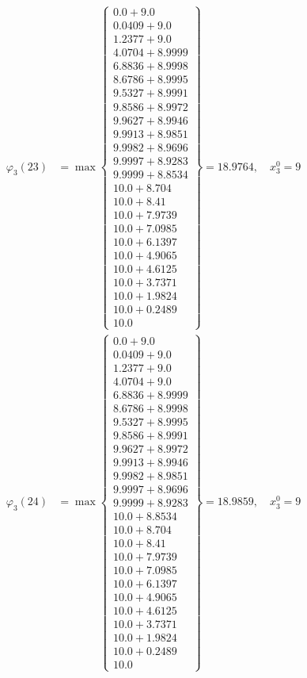 \documentclass{article}
\begin{document}
\begin{align*}
  
  
  
\varphi_{3}(23) &= \max \left\{ \begin{array}{c}
0.0 + 9.0 \\
 0.0409 + 9.0 \\
 1.2377 + 9.0 \\
 4.0704 + 8.9999 \\
 6.8836 + 8.9998 \\
 8.6786 + 8.9995 \\
 9.5327 + 8.9991 \\
 9.8586 + 8.9972 \\
 9.9627 + 8.9946 \\
 9.9913 + 8.9851 \\
 9.9982 + 8.9696 \\
 9.9997 + 8.9283 \\
 9.9999 + 8.8534 \\
 10.0 + 8.704 \\
 10.0 + 8.41 \\
 10.0 + 7.9739 \\
 10.0 + 7.0985 \\
 10.0 + 6.1397 \\
 10.0 + 4.9065 \\
 10.0 + 4.6125 \\
 10.0 + 3.7371 \\
 10.0 + 1.9824 \\
 10.0 + 0.2489 \\
 10.0
\end{array} \right\}=18.9764,\quad x_{3}^0=9\\
  
  
  
  
\varphi_{3}(24) &= \max \left\{ \begin{array}{c}
0.0 + 9.0 \\
 0.0409 + 9.0 \\
 1.2377 + 9.0 \\
 4.0704 + 9.0 \\
 6.8836 + 8.9999 \\
 8.6786 + 8.9998 \\
 9.5327 + 8.9995 \\
 9.8586 + 8.9991 \\
 9.9627 + 8.9972 \\
 9.9913 + 8.9946 \\
 9.9982 + 8.9851 \\
 9.9997 + 8.9696 \\
 9.9999 + 8.9283 \\
 10.0 + 8.8534 \\
 10.0 + 8.704 \\
 10.0 + 8.41 \\
 10.0 + 7.9739 \\
 10.0 + 7.0985 \\
 10.0 + 6.1397 \\
 10.0 + 4.9065 \\
 10.0 + 4.6125 \\
 10.0 + 3.7371 \\
 10.0 + 1.9824 \\
 10.0 + 0.2489 \\
 10.0
\end{array} \right\}=18.9859,\quad x_{3}^0=9\\
  

\end{align*}
\end{document}
